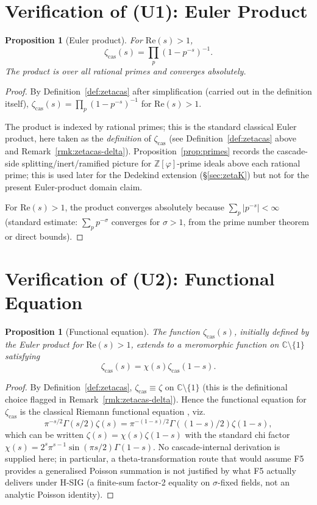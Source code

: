 \documentclass[11pt, a4paper]{amsart}
\newtheorem{proposition}[theorem]{Proposition}
\theoremstyle{definition}
\newcommand{\Z}{\mathbb{Z}}
\newcommand{\C}{\mathbb{C}}
\newcommand{\pphi}{\varphi}
\newcommand{\zetacas}{\zeta_{\mathrm{cas}}}
\begin{document}
\section{Verification of (U1): Euler Product}\label{sec:euler}

\begin{proposition}[Euler product]\label{prop:euler}
For $\mathrm{Re}(s) > 1$,
\[
\zetacas(s) = \prod_p (1 - p^{-s})^{-1}.
\]
The product is over all rational primes and converges absolutely.
\end{proposition}

\begin{proof}
By Definition~\ref{def:zetacas} after simplification (carried out
in the definition itself), $\zetacas(s) = \prod_p (1 - p^{-s})^{-1}$
for $\mathrm{Re}(s) > 1$.

The product is indexed by rational primes; this is the standard
classical Euler product, here taken as the \emph{definition} of
$\zetacas$ (see Definition~\ref{def:zetacas} above and
Remark~\ref{rmk:zetacas-delta}).  Proposition~\ref{prop:primes}
records the cascade-side splitting/inert/ramified picture for
$\Z[\pphi]$-prime ideals above each rational prime; this is used
later for the Dedekind extension (\S\ref{sec:zetaK}) but not for
the present Euler-product domain claim.

For $\mathrm{Re}(s) > 1$, the product converges absolutely because
$\sum_p |p^{-s}| < \infty$ (standard estimate: $\sum_p p^{-\sigma}$
converges for $\sigma > 1$, from the prime number theorem or
direct bounds).
\end{proof}

\section{Verification of (U2): Functional Equation}\label{sec:functional}

\begin{proposition}[Functional equation]\label{prop:fe}
The function $\zetacas(s)$, initially defined by the Euler product for
$\mathrm{Re}(s) > 1$, extends to a meromorphic function on
$\C \setminus \{1\}$ satisfying
\[
\zetacas(s) = \chi(s) \zetacas(1 - s).
\]
\end{proposition}

\begin{proof}
By Definition~\ref{def:zetacas}, $\zetacas \equiv \zeta$ on
$\C \setminus \{1\}$ (this is the definitional choice flagged in
Remark~\ref{rmk:zetacas-delta}).  Hence the functional equation
for $\zetacas$ is the classical Riemann functional equation
\cite{Riemann1859}, viz.\
\[
\pi^{-s/2}\Gamma(s/2)\zeta(s)
   = \pi^{-(1-s)/2}\Gamma((1-s)/2)\zeta(1-s),
\]
which can be written $\zeta(s) = \chi(s)\zeta(1-s)$ with the
standard chi factor
$\chi(s) = 2^s \pi^{s-1} \sin(\pi s/2)\Gamma(1-s)$.  No
cascade-internal derivation is supplied here; in particular, a
theta-transformation route that would assume F5 provides a
generalised Poisson summation is not justified by what F5 actually
delivers under H-SIG (a finite-sum factor-2 equality on
$\sigma$-fixed fields, not an analytic Poisson identity).
\end{proof}
\end{document}
